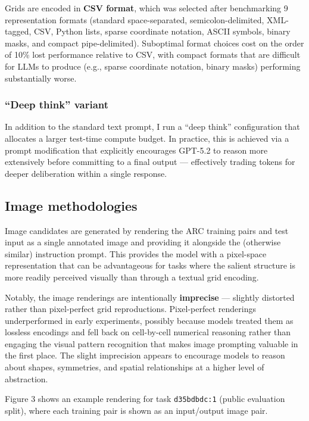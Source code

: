 \documentclass[11pt]{article}
\begin{document}
Grids are encoded in \textbf{CSV format}, which was selected after
benchmarking 9 representation formats (standard space-separated,
semicolon-delimited, XML-tagged, CSV, Python lists, sparse coordinate
notation, ASCII symbols, binary masks, and compact pipe-delimited).
Suboptimal format choices cost on the order of 10\% lost performance
relative to CSV, with compact formats that are difficult for LLMs to
produce (e.g., sparse coordinate notation, binary masks) performing
substantially worse.

\hypertarget{deep-think-variant}{%
\subsubsection{``Deep think'' variant}\label{deep-think-variant}}

In addition to the standard text prompt, I run a ``deep think''
configuration that allocates a larger test-time compute budget. In
practice, this is achieved via a prompt modification that explicitly
encourages GPT-5.2 to reason more extensively before committing to a
final output --- effectively trading tokens for deeper deliberation
within a single response.

\hypertarget{image-methodologies}{%
\subsection{Image methodologies}\label{image-methodologies}}

Image candidates are generated by rendering the ARC training pairs and
test input as a single annotated image and providing it alongside the
(otherwise similar) instruction prompt. This provides the model with a
pixel-space representation that can be advantageous for tasks where the
salient structure is more readily perceived visually than through a
textual grid encoding.

Notably, the image renderings are intentionally \textbf{imprecise} ---
slightly distorted rather than pixel-perfect grid reproductions.
Pixel-perfect renderings underperformed in early experiments, possibly
because models treated them as lossless encodings and fell back on
cell-by-cell numerical reasoning rather than engaging the visual pattern
recognition that makes image prompting valuable in the first place. The
slight imprecision appears to encourage models to reason about shapes,
symmetries, and spatial relationships at a higher level of abstraction.

Figure 3 shows an example rendering for task \texttt{d35bdbdc:1} (public
evaluation split), where each training pair is shown as an input/output
image pair.
\end{document}
